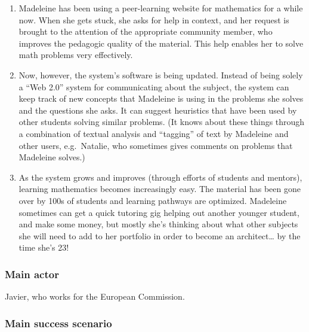 \begin{enumerate}
\item
  Madeleine has been using a peer-learning website for mathematics for a
  while now. When she gets stuck, she asks for help in context, and her
  request is brought to the attention of the appropriate community
  member, who improves the pedagogic quality of the material. This help
  enables her to solve math problems very effectively.
\item
  Now, however, the system's software is being updated. Instead of being
  solely a ``Web 2.0'' system for communicating about the subject, the
  system can keep track of new concepts that Madeleine is using in the
  problems she solves and the questions she asks. It can suggest
  heuristics that have been used by other students solving similar
  problems. (It knows about these things through a combination of
  textual analysis and ``tagging'' of text by Madeleine and other users,
  e.g.~Natalie, who sometimes gives comments on problems that Madeleine
  solves.)
\item
  As the system grows and improves (through efforts of students and
  mentors), learning mathematics becomes increasingly easy. The material
  has been gone over by 100s of students and learning pathways are
  optimized. Madeleine sometimes can get a quick tutoring gig helping
  out another younger student, and make some money, but mostly she's
  thinking about what other subjects she will need to add to her
  portfolio in order to become an architect\ldots{} by the time she's
  23!
\end{enumerate}
\subsubsection{Main actor}

Javier, who works for the European Commission.

\subsubsection{Main success scenario}

